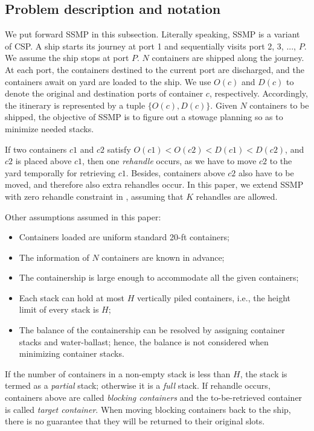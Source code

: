 \documentclass[review,3p,times,authoryear,12pt]{elsarticle}
\begin{document}
\subsection{Problem description and notation}
We put forward SSMP in this subsection.
Literally speaking, SSMP is a variant of CSP.
A ship starts its journey at port 1 and sequentially visits port 2, 3, ..., $P$. We assume the ship stops at port $P$.
$N$ containers are shipped along the journey.
At each port, the containers destined to the current port are discharged, and the containers await on yard are loaded to the ship.
We use $O(c)$ and $D(c)$ to denote the original and destination ports of container $c$, respectively. Accordingly, the itinerary is represented by a tuple $\{O(c), D(c)\}$.
Given $N$ containers to be shipped, the objective of SSMP is to figure out a stowage planning so as to minimize needed stacks.

If two containers $c1$ and $c2$ satisfy $O(c1)<O(c2)<D(c1)<D(c2)$, and $c2$ is placed above $c1$, then one \textit{rehandle} occurs, as we have to move $c2$ to the yard temporally for retrieving $c1$. Besides, containers above $c2$ also have to be moved, and therefore also extra rehandles occur.
In this paper, we extend SSMP with zero rehandle constraint in \cite{wang2014stowage}, assuming that $K$ rehandles are allowed.



Other assumptions assumed in this paper:
\begin{itemize}
\item Containers loaded are uniform standard 20-ft containers;
\item The information of $N$ containers are known in advance;
\item The containership is large enough to accommodate all the given containers;
\item Each stack can hold at most $H$ vertically piled containers, i.e., the height limit of every stack is $H$;
\item The balance of the containership can be resolved by assigning container stacks and water-ballast; hence, the balance is not considered when minimizing container stacks.
\end{itemize}

If the number of containers in a non-empty stack is less than $H$, the stack is termed as a \textit{partial} stack; otherwise it is a \textit{full} stack.
If rehandle occurs, containers above are called \textit{blocking containers} and the to-be-retrieved container is called \textit{target container}.
When moving blocking containers back to the ship, there is no guarantee that they will be returned to their original slots.
\end{document}
